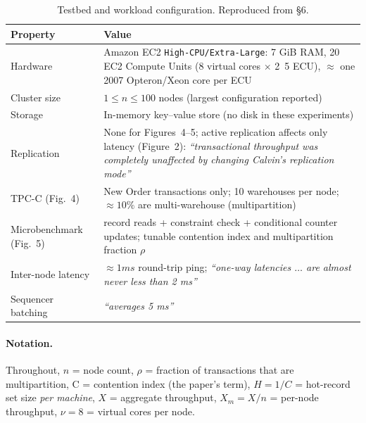 \documentclass[11pt,a4paper]{article}
\newcommand{\hot}{C}
\newcommand{\tput}{\ensuremath{X}}
\newcommand{\pernode}{X_m}
\begin{document}
\begin{table}[H]
\centering
\caption{Testbed and workload configuration. Reproduced from \S6.}
\begin{tabular}{@{}>{\raggedright\arraybackslash}p{3.1cm}
                  >{\raggedright\arraybackslash}p{\dimexpr\textwidth-3.1cm-2\tabcolsep\relax}@{}}
\toprule
\textbf{Property} & \textbf{Value} \\
\midrule
Hardware & Amazon EC2 \texttt{High-CPU/Extra-Large}: \si{7} GiB RAM,
           \si{20} EC2 Compute Units (8 virtual cores $\times$ \si{2.5} ECU),
           $\approx$ one 2007 Opteron/Xeon core per ECU \\
Cluster size & $1 \le n \le 100$ nodes (largest configuration reported) \\
Storage & In-memory key--value store (no disk in these experiments) \\
Replication & None for Figures~4--5; active replication affects only
              latency (Figure~2): \emph{``transactional throughput was
              completely unaffected by changing Calvin's replication mode''} \\
TPC-C (Fig.~4) & New Order transactions only; 10 warehouses per node;
              $\approx10\%$ are multi-warehouse (multipartition) \\
Microbenchmark (Fig.~5) & 10 record reads + constraint check + conditional
              counter updates; tunable contention index and multipartition
              fraction $\rho$ \\
Inter-node latency & $\approx\si{1} ms$ round-trip ping;
              \emph{``one-way latencies $\ldots$ are almost never less than
              \si{2} ms''} \\
Sequencer batching & \emph{``averages \si{5} ms''} \\
\bottomrule
\end{tabular}
\end{table}

\paragraph{Notation.} Throughout, $n$ = node count, $\rho$ = fraction of
transactions that are multipartition, \hot{} = contention index (the paper's
term), $H = 1/\hot{}$ = hot-record set size \emph{per machine},
$\tput$ = aggregate throughput, $\pernode = \tput/n$ = per-node throughput,
$\nu = 8$ = virtual cores per node.

\end{document}
